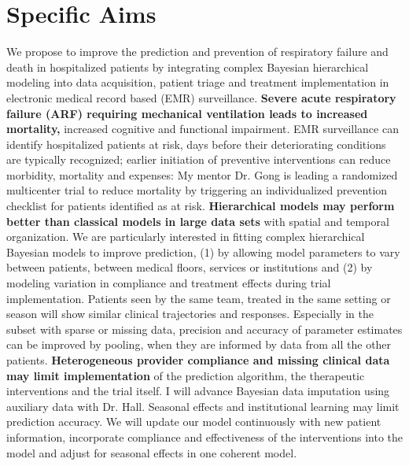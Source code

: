 \documentclass[11pt,notitlepage]{article}
\begin{document}
\part*{Specific Aims}
We propose to improve the prediction and prevention of respiratory failure and death in hospitalized patients by integrating complex Bayesian hierarchical modeling into data acquisition, patient triage and treatment implementation in electronic medical record based (EMR) surveillance.\newline
\textbf{Severe acute respiratory failure (ARF) requiring mechanical ventilation leads to increased mortality,} increased cognitive and functional impairment. EMR surveillance can identify hospitalized patients at risk, days before their deteriorating conditions are typically recognized; earlier initiation of preventive interventions can reduce morbidity, mortality and expenses: My mentor Dr. Gong is leading a randomized multicenter trial to reduce mortality by triggering an individualized prevention checklist for patients identified as at risk. \newline
\textbf{Hierarchical models may perform better than classical models in large data sets} with spatial and temporal organization.
We are particularly interested in fitting complex hierarchical Bayesian models to improve prediction, (1) by allowing model parameters to vary between patients, between medical floors, services or institutions and (2) by modeling variation in compliance and treatment effects during trial implementation. Patients seen by the same team, treated in the same setting or season will show similar clinical trajectories and responses. Especially in the subset with sparse or missing data, precision and accuracy of parameter estimates can be improved by pooling, when they are informed by data from all the other patients. 
\newline \textbf{Heterogeneous provider compliance and missing clinical data may limit implementation} of the prediction algorithm, the therapeutic interventions and the trial itself. I will advance Bayesian data imputation using auxiliary data with Dr. Hall. Seasonal effects and institutional learning may limit prediction accuracy. We will update our model continuously with new patient information, incorporate compliance and effectiveness of the interventions into the model and adjust for seasonal effects in one coherent model.
\end{document}
